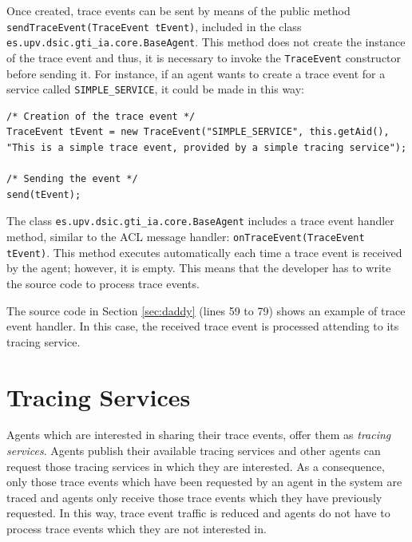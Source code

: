 	Once created, trace events can be sent by means of the public method
	\lstinline{sendTraceEvent(TraceEvent tEvent)}, included in the class
	\lstinline{es.upv.dsic.gti_ia.core.BaseAgent}. This method does not create the instance of the trace
	event and thus, it is necessary to invoke the \texttt{TraceEvent} constructor before sending it. For
	instance, if an agent wants to create a trace event for a service called \lstinline{SIMPLE_SERVICE},
	it could be made in this way:

	\begin{lstlisting}
/* Creation of the trace event */
TraceEvent tEvent = new TraceEvent("SIMPLE_SERVICE", this.getAid(), "This is a simple trace event, provided by a simple tracing service");

/* Sending the event */
send(tEvent);
	\end{lstlisting}

%

	The class \lstinline{es.upv.dsic.gti_ia.core.BaseAgent} includes a trace event handler method,
	similar to the ACL message handler: \lstinline{onTraceEvent(TraceEvent tEvent)}. This method
	executes automatically each time a trace event is received by the agent; however, it is empty. This
	means that the developer has to write the source code to process trace events.

	The source code in Section \ref{sec:daddy} (lines 59 to 79) shows an example of trace event
	handler. In this case, the received trace event is processed attending to its tracing service.

\section{Tracing Services}\label{sec:tservices}

	Agents which are interested in sharing their trace events, offer them as \textit{tracing services}.
	Agents publish their available tracing services and other agents can request those tracing services
	in which they are interested. As a consequence, only those trace events which have been
	requested by an agent in the system are traced and agents only receive those trace events
	which they have previously requested. In this way, trace event traffic is reduced and agents do
	not have to process trace events which they are not interested in.


